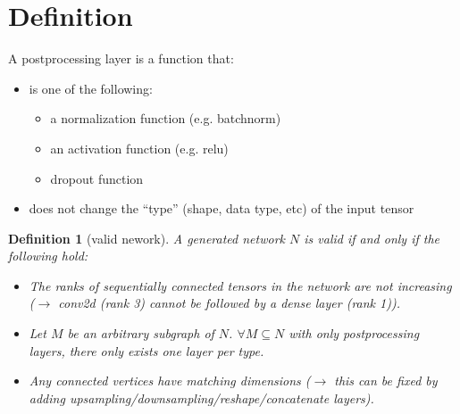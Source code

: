 \documentclass[12pt]{article}
\newtheorem{definition}{Definition}
\begin{document}
\maketitle


\section{Definition}

A postprocessing layer is a function that:
\begin{itemize}
\item is one of the following:
  \begin{itemize}
  \item a normalization function (e.g. batchnorm)
  \item an activation function (e.g. relu)
  \item dropout function
  \end{itemize}
\item does not change the ``type'' (shape, data type, etc) of the input tensor
\end{itemize}

\begin{definition}[valid nework]
  A generated network $N$ is valid if and only if the following hold:
  \begin{itemize}
    \item The ranks of sequentially connected tensors in the network are not increasing ($\rightarrow$ conv2d (rank 3) cannot be followed by a dense layer (rank 1)).
  \item Let $M$ be an arbitrary subgraph of $N$. $\forall M\subseteq N$ with only postprocessing layers, there only exists one layer per type.
  \item Any connected vertices have matching dimensions ($\rightarrow$ this can be fixed by adding upsampling/downsampling/reshape/concatenate layers).
    \end{itemize}
  \end{definition}



\end{document}
